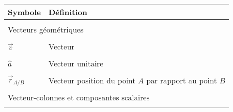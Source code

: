 \begin{center}
\begin{tabular}{p{5cm}  p{9cm}}
\hline
\textbf{Symbole} & \textbf{Définition} \\ \hline\hline \\
\multicolumn{2}{l}{Vecteurs géométriques} \\ \hline \\
$\vec{v}$            & Vecteur      \\   &  \\ 
$\hat{a}$            & Vecteur unitaire   \\   &  \\ 
$\vec{r}_{A/B}$      & Vecteur position du point $A$ par rapport au point $B$ \\   &  \\ 
\multicolumn{2}{l}{Vecteur-colonnes et composantes scalaires} \\ \hline \\

\end{tabular}
\end{center}
